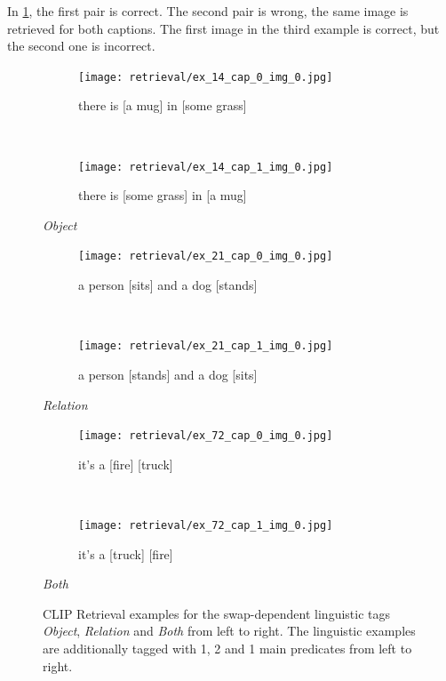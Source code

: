 In \cref{fig:retrieval-examples-linguistic}, the first pair is correct. The second pair is wrong, the same image is retrieved for both captions. The first image in the third example is correct, but the second one is incorrect.

\begin{figure}[ht]
\centering
    \begin{minipage}[t]{.30\textwidth}
        \begin{subfigure}[t]{\textwidth}
        \centering
        \texttt{[image: retrieval/ex\_14\_cap\_0\_img\_0.jpg]}
        \caption{there is [a mug] in [some grass]}
        \end{subfigure}\\
        \begin{subfigure}[t]{\textwidth}
        \centering
        \texttt{[image: retrieval/ex\_14\_cap\_1\_img\_0.jpg]}
        \caption{there is [some grass] in [a mug]}
        \end{subfigure}%
        \caption*{\textit{Object}}
    \end{minipage}
    \hfill
    \begin{minipage}[t]{.30\textwidth}
        \begin{subfigure}[t]{\textwidth}
        \centering
        \texttt{[image: retrieval/ex\_21\_cap\_0\_img\_0.jpg]}
        \caption{a person [sits] and a dog [stands]}
        \end{subfigure}\\
        \begin{subfigure}[t]{\textwidth}
        \centering
        \texttt{[image: retrieval/ex\_21\_cap\_1\_img\_0.jpg]}
        \caption{a person [stands] and a dog [sits]}
        \end{subfigure}%
        \caption*{\textit{Relation}}
    \end{minipage}
    \hfill
    \begin{minipage}[t]{.30\textwidth}
        \begin{subfigure}[t]{\textwidth}
        \centering
        \texttt{[image: retrieval/ex\_72\_cap\_0\_img\_0.jpg]}
        \caption{it's a [fire] [truck]}
        \end{subfigure}\\
        \begin{subfigure}[t]{\textwidth}
        \centering
        \texttt{[image: retrieval/ex\_72\_cap\_1\_img\_0.jpg]}
        \caption{it's a [truck] [fire]}
        \end{subfigure}%
        \caption*{\textit{Both}}
    \end{minipage}%
    \caption{CLIP Retrieval examples for the swap-dependent linguistic tags \textit{Object}, \textit{Relation} and \textit{Both} from left to right. The linguistic examples are additionally tagged with 1, 2 and 1 main predicates from left to right.}
    \label{fig:retrieval-examples-linguistic}
\end{figure}

